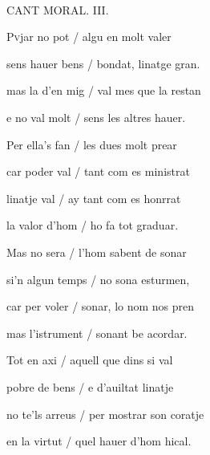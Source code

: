\documentclass[12pt]{article}
\renewcommand{\espaiAbansEtiquetaPoema}{\vspace{0ex}}
\begin{document}
\begin{estrofa}

\espaiAbansEtiquetaPoema

\\

\begin{rubrica}

CANT MORAL. III.

\end{rubrica}

\end{estrofa}


\begin{estrofa}

 P\textsc{v}jar no pot / algu en molt valer

 sens hauer bens / bondat, linatge gran.

 mas la d'en mig / val mes que la restan

 e no val molt / sens les altres hauer.

 Per ella's fan / les dues molt prear

 car poder val / tant com es ministrat

 linatje val / ay tant com es honrrat

 la valor d'hom / ho fa tot graduar.

\end{estrofa}



\begin{estrofa}

 Mas no sera / l'hom sabent de sonar

 si'n algun temps / no sona esturmen,

 car per voler / sonar, lo nom nos pren

 mas l'istrument / sonant be acordar.

 Tot en axi / aquell que dins si val

 pobre de bens / e d'auiltat linatje

 no te'ls arreus / per mostrar son coratje

 en la virtut / quel hauer d'hom hical.

\end{estrofa}
\end{document}
